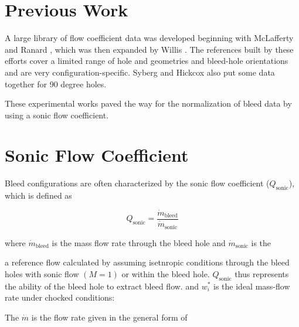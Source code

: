 \documentclass{article}
\newcommand{\sfrac}[2]{\textstyle\frac{#1}{#2}}
\newcommand{\mdot}{\dot{m}}
\newcommand{\trm}[1]{\textrm{#1}}
\begin{document}


\section{Previous Work}


A large library of flow coefficient data was developed beginning with McLafferty and Ranard \cite{McLafferty1958}, which was then expanded by Willis \cite{Willis1995}. The references built by these efforts cover a limited range of hole and geometries and bleed-hole orientations and are very configuration-specific. Syberg and Hickcox \cite{Syberg1973b} also put some data together for 90 degree holes.

These experimental works paved the way for the normalization of bleed data by using a sonic flow coefficient.

\section{Sonic Flow Coefficient}

Bleed configurations are often characterized by the sonic flow coefficient ($Q_\textrm{sonic}$), which is defined as

$$ Q_\trm{sonic} = \frac{\mdot_\trm{bleed}}{\mdot_\trm{sonic}} $$

where $\mdot_\trm{bleed}$ is the mass flow rate through the bleed hole and $\mdot_\trm{sonic}$ is the 

a reference flow calculated by assuming isetnropic conditions through the bleed holes with sonic flow $(M=1)$ or within the bleed hole. $Q_\trm{sonic}$ thus represents the ability of the bleed hole to extract bleed flow.
and $w_i^*$ is the ideal mass-flow rate under chocked conditions:

The $\mdot$ is the flow rate given in the general form of

\end{document}
